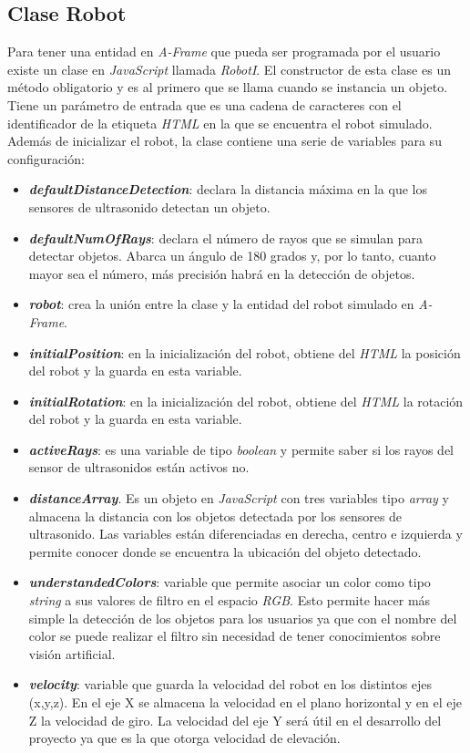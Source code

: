 \subsection{Clase Robot}
\label{subsec:robot}
Para tener una entidad en \textit{A-Frame} que pueda ser programada por el usuario existe un clase en \textit{JavaScript} llamada \textit{RobotI}.
El constructor de esta clase es un método obligatorio y es al primero que se llama cuando se instancia un objeto. 
Tiene un parámetro de entrada que es una cadena de caracteres con el identificador de la etiqueta \textit{HTML} en la que se encuentra el robot simulado. 
Además de inicializar el robot, la clase contiene una serie de variables para su configuración: 
\begin{itemize}
    \item \textit{\textbf{defaultDistanceDetection}}: declara la distancia máxima en la que los sensores de ultrasonido detectan un objeto.
    \item \textit{\textbf{defaultNumOfRays}}: declara el número de rayos que se simulan para detectar objetos. Abarca un ángulo de 180 grados y, por lo tanto, cuanto mayor sea el número, más precisión habrá en la detección de objetos. 
    \item \textit{\textbf{robot}}: crea la unión entre la clase y la entidad del robot simulado en \textit{A-Frame}.
    \item \textit{\textbf{initialPosition}}: en la inicialización del robot, obtiene del \textit{HTML} la posición del robot y la guarda en esta variable.  
    \item \textit{\textbf{initialRotation}}: en la inicialización del robot, obtiene del \textit{HTML} la rotación del robot y la guarda en esta variable.  
    \item \textit{\textbf{activeRays}}: es una variable de tipo \textit{boolean} y permite saber si los rayos del sensor de ultrasonidos están activos no.
    \item \textit{\textbf{distanceArray}}. Es un objeto en \textit{JavaScript} con tres variables tipo \textit{array} y almacena la distancia con los objetos detectada por los sensores de ultrasonido. Las variables están diferenciadas en derecha, centro e izquierda y permite conocer donde se encuentra la ubicación del objeto detectado. 
    \item \textit{\textbf{understandedColors}}: variable que permite asociar un color como tipo \textit{string} a sus valores de filtro en el espacio \textit{RGB}. Esto permite hacer más simple la detección de los objetos para los usuarios ya que con el nombre del color se puede realizar el filtro sin necesidad de tener conocimientos sobre visión artificial.
    \item \textit{\textbf{velocity}}: variable que guarda la velocidad del robot en los distintos ejes (x,y,z). En el eje X se almacena la velocidad en el plano horizontal y en el eje Z la velocidad de giro. La velocidad del eje Y será útil en el desarrollo del proyecto ya que es la que otorga velocidad de elevación. 
\end{itemize}

